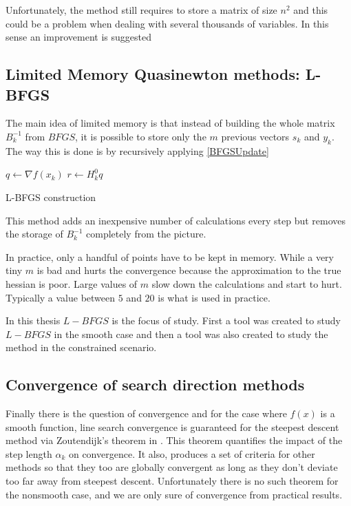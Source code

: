 Unfortunately, the method still requires to store a matrix of size $n^2$ and this could be a problem when dealing with several thousands of variables. In this sense an improvement is suggested

\subsection{Limited Memory Quasinewton methods: L-BFGS }

The main idea of limited memory is that instead of building the whole matrix $B_k^{-1}$ from $BFGS$, it is possible to store only the $m$ previous vectors $s_k$ and $y_k$. The way this is done is by recursively applying \ref{BFGSUpdate} \citep{nocedal}


\linesnumbered
\begin{algorithm}[H]
 \SetAlgoLined 
 
 $q \leftarrow \nabla f(x_k)$\;
 $r \leftarrow H_k^0q$\;
 \caption{L-BFGS construction\label{LBFGSalgo}}
\end{algorithm}

This method adds an inexpensive number of calculations every step but removes the storage of $B_k^{-1}$ completely from the picture.

In practice, only a handful of points have to be kept in memory. While a very tiny $m$ is bad and hurts the convergence because the approximation to the true hessian is poor. Large values of $m$ slow down the calculations and start to hurt. Typically a value between $5$ and $20$ is what is used in practice.

In this thesis $L-BFGS$ is the focus of study. First a tool was created to study $L-BFGS$ in the smooth case and then a tool was also created to study the method in the constrained scenario.

\subsection{Convergence of search direction methods}

Finally there is the question of convergence and for the case where $f(x)$ is a smooth function, line search convergence is guaranteed for the steepest descent method via Zoutendijk's theorem \citep{zoutendijk} in \citep{Abadie}. This theorem quantifies the impact of the step length $\alpha_k$ on convergence. It also, produces a set of criteria for other methods so that they too are globally convergent as long as they don't deviate too far away from steepest descent. Unfortunately there is no such theorem for the nonsmooth case, and we are only sure of convergence from practical results.

